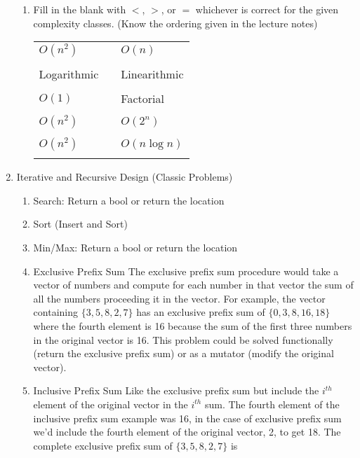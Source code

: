 \documentclass[nobib]{tufte-handout}
\begin{document}
\begin{enumerate}
\begin{enumerate}
      \item Fill in the blank with \( < \), \( > \), or \( = \) whichever is correct for the given complexity classes. (Know the ordering given in the lecture notes)

      \vspace{.2in}
      \begin{tabular}{lll}
        \( O(n^2) \) & \underline{\hspace{2in}} & \( O(n) \) \\ \\
        Logarithmic & \underline{\hspace{2in}} & Linearithmic \\ \\
        \( O(1) \) & \underline{\hspace{2in}} & Factorial \\ \\
        \( O(n^2)\) & \underline{\hspace{2in}} & \( O(2^n) \) \\ \\
        \( O(n^2)\) & \underline{\hspace{2in}} & \( O(n \log n) \) \\ \\
      \end{tabular}
    \end{enumerate}
\item Iterative and Recursive Design (Classic Problems)
\begin{enumerate}
  \item Search: Return a bool or return the location
  \item Sort (Insert and Sort)
  \item Min/Max: Return a bool or return the location
  \item Exclusive Prefix Sum \newline
  The exclusive prefix sum procedure would take a vector of numbers and compute for each number in that vector the sum of all the numbers proceeding it in the vector. For example, the vector containing \( \{3,5,8,2,7 \} \) has an exclusive prefix sum of \( \{ 0,3,8,16,18 \} \) where the fourth element is 16 because the sum of the first three numbers in the original vector is 16. This problem could be solved functionally (return the exclusive prefix sum) or as a mutator (modify the original vector).
  \item Inclusive Prefix Sum \newline
  Like the exclusive prefix sum but include the \(i^{th}\) element of the original vector in the \(i^{th}\) sum. The fourth element of the inclusive prefix sum example was 16, in the case of exclusive prefix sum we'd include the fourth element of the original vector, 2, to get 18. The complete exclusive prefix sum of \( \{3,5,8,2,7 \} \) is

\end{enumerate}
\end{enumerate}
\end{document}
